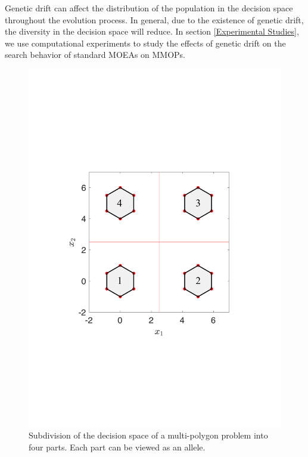 \documentclass[conference]{IEEEtran}
\begin{document}
Genetic drift can affect the distribution of the population in the decision space throughout the evolution process. In general, due to the existence of genetic drift, the diversity in the decision space will reduce. In section \ref{Experimental Studies}, we use computational experiments to study the effects of genetic drift on the search behavior of standard MOEAs on MMOPs.

\begin{figure}[t!]
    \centering
    \includegraphics[width=.3\textwidth]{Section3/Alleles}
    \caption{Subdivision of the decision space of a multi-polygon problem into four parts. Each part can be viewed as an allele.}
    \label{fig: Alleles}
\end{figure}
\end{document}
